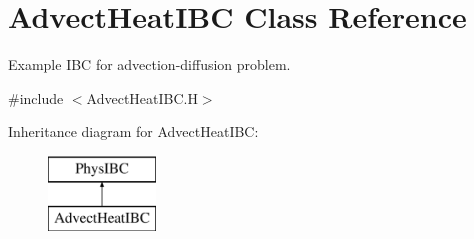 \hypertarget{class_advect_heat_i_b_c}{\section{Advect\-Heat\-I\-B\-C Class Reference}
\label{class_advect_heat_i_b_c}
}


Example I\-B\-C for advection-\/diffusion problem.  




{\ttfamily \#include $<$Advect\-Heat\-I\-B\-C.\-H$>$}

Inheritance diagram for Advect\-Heat\-I\-B\-C\-:\begin{figure}[H]
\begin{center}
\leavevmode
\includegraphics[height=2.000000cm]{class_advect_heat_i_b_c}
\end{center}
\end{figure}
